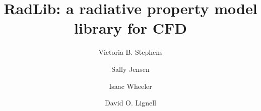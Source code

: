\documentclass[preprint,12pt]{elsarticle}
\begin{document}
\begin{frontmatter}



\title{RadLib: a radiative property model library for CFD}




\author{Victoria B. Stephens}
\author{Sally Jensen}
\author{Isaac Wheeler}
\author{David O. Lignell}


\address{Department of Chemical Engineering, Brigham Young University, Provo, UT 84602, United States}



\end{frontmatter}
\end{document}
